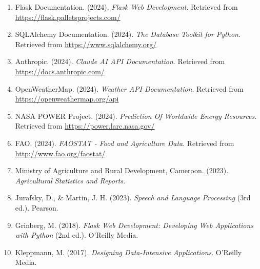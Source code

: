 \documentclass[12pt,a4paper]{article}
\begin{document}
\begin{enumerate}[leftmargin=*]
    \item Flask Documentation. (2024). \textit{Flask Web Development}. Retrieved from \url{https://flask.palletsprojects.com/}

    \item SQLAlchemy Documentation. (2024). \textit{The Database Toolkit for Python}. Retrieved from \url{https://www.sqlalchemy.org/}

    \item Anthropic. (2024). \textit{Claude AI API Documentation}. Retrieved from \url{https://docs.anthropic.com/}

    \item OpenWeatherMap. (2024). \textit{Weather API Documentation}. Retrieved from \url{https://openweathermap.org/api}

    \item NASA POWER Project. (2024). \textit{Prediction Of Worldwide Energy Resources}. Retrieved from \url{https://power.larc.nasa.gov/}

    \item FAO. (2024). \textit{FAOSTAT - Food and Agriculture Data}. Retrieved from \url{http://www.fao.org/faostat/}

    \item Ministry of Agriculture and Rural Development, Cameroon. (2023). \textit{Agricultural Statistics and Reports}.

    \item Jurafsky, D., \& Martin, J. H. (2023). \textit{Speech and Language Processing} (3rd ed.). Pearson.

    \item Grinberg, M. (2018). \textit{Flask Web Development: Developing Web Applications with Python} (2nd ed.). O'Reilly Media.

    \item Kleppmann, M. (2017). \textit{Designing Data-Intensive Applications}. O'Reilly Media.
\end{enumerate}
\end{document}
